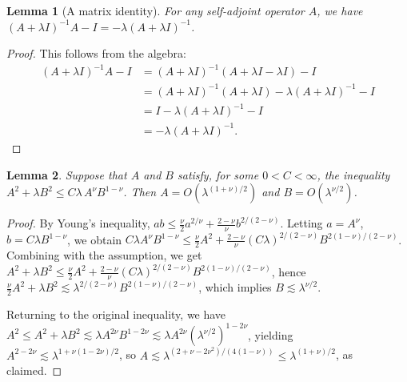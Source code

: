 \documentclass[11pt]{article}
\theoremstyle{plain}
\newtheorem{lemma}{Lemma}
\theoremstyle{definition}
\theoremstyle{remark}
\theoremstyle{definition}
\begin{document}
\begin{lemma}[A matrix identity]
\label{lemma:matrixidentity} For any self-adjoint operator $A$, we have   $(A + \lambda I)^{-1} A - I = -\lambda (A + \lambda I)^{-1}$.
 
\end{lemma}
\begin{proof}
    This follows from the algebra:
\begin{align*}
(A + \lambda I)^{-1}A - I
&= (A + \lambda I)^{-1}(A + \lambda I - \lambda I) - I\\
&= (A + \lambda I)^{-1}(A + \lambda I) - \lambda(A + \lambda I)^{-1} - I\\
&= I - \lambda(A + \lambda I)^{-1} - I\\
&= -\lambda(A + \lambda I)^{-1}.
\end{align*}
\end{proof}


\begin{lemma}
Suppose that \(A\) and \(B\) satisfy, for some \(0 < C < \infty\), the inequality \(A^2 + \lambda B^2 \leq C\lambda\, A^{\nu} B^{1 - \nu}\). Then \(A = O(\lambda^{(1 + \nu)/2})\) and \(B = O(\lambda^{\nu/2})\).
\label{lemma::youngs}
\end{lemma}
\begin{proof}
By Young's inequality, \(ab \leq \frac{\nu}{2} a^{2/\nu} + \frac{2 - \nu}{\nu} b^{2/(2 - \nu)}\). Letting \(a = A^\nu\), \(b = C\lambda B^{1 - \nu}\), we obtain \(C \lambda A^\nu B^{1 - \nu} \leq \frac{\nu}{2} A^2 + \frac{2 - \nu}{\nu} (C\lambda)^{2/(2 - \nu)} B^{2(1 - \nu)/(2 - \nu)}\). Combining with the assumption, we get \(A^2 + \lambda B^2 \leq \frac{\nu}{2} A^2 + \frac{2 - \nu}{\nu} (C\lambda)^{2/(2 - \nu)} B^{2(1 - \nu)/(2 - \nu)}\), hence \(\frac{\nu}{2} A^2 + \lambda B^2 \lesssim \lambda^{2/(2 - \nu)} B^{2(1 - \nu)/(2 - \nu)}\), which implies \(B \lesssim \lambda^{\nu/2}\).

Returning to the original inequality, we have \(A^2 \leq A^2 + \lambda B^2 \lesssim \lambda A^{2\nu} B^{1 - 2\nu} \lesssim \lambda A^{2\nu} (\lambda^{\nu/2})^{1 - 2\nu}\), yielding \(A^{2 - 2\nu} \lesssim \lambda^{1 + \nu(1 - 2\nu)/2}\), so \(A \lesssim \lambda^{(2 + \nu - 2\nu^2)/(4(1 - \nu))} \leq \lambda^{(1 + \nu)/2}\), as claimed.
\end{proof}
\end{document}
